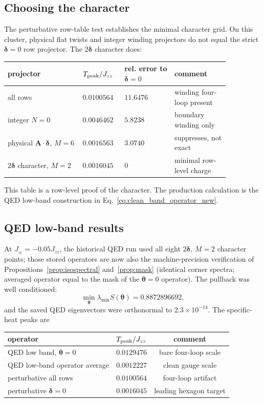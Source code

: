 \documentclass[11pt,letterpaper]{article}
\newcommand{\Jzz}{J_{zz}}
\newcommand{\Jpm}{J_{\pm}}
\newcommand{\bA}{\bm A}
\newcommand{\bdelta}{\bm \delta}
\newcommand{\btheta}{\bm \theta}
\theoremstyle{plain}
\theoremstyle{definition}
\begin{document}
\subsection{Choosing the character}

The perturbative row-table test establishes the minimal character grid.  On
this cluster, physical flat twists and integer winding projectors do not equal
the strict $\bdelta=0$ row projector.  The $2\bdelta$ character does:
\begin{center}
\footnotesize
\begin{tabular}{@{}p{0.30\linewidth}p{0.14\linewidth}p{0.20\linewidth}p{0.22\linewidth}@{}}
\toprule
projector & $T_{\rm peak}/\Jzz$ & rel. error to $\bdelta=0$
& comment\\
\midrule
all rows & $0.0100564$ & $11.6476$ & winding four-loop present\\
integer $N=0$ & $0.0046462$ & $5.8238$ & boundary winding only\\
physical $\bA\!\cdot\!\bdelta$, $M=6$ & $0.0016563$ & $3.0740$
& suppresses, not exact\\
$2\bdelta$ character, $M=2$ & $0.0016045$ & $0$
& minimal row-level charge\\
\bottomrule
\end{tabular}
\end{center}
This table is a row-level proof of the character.  The production calculation
is the QED low-band construction in Eq.~\eqref{eq:clean_band_operator_new}.

\subsection{QED low-band results}

At $\Jpm=-0.05\Jzz$, the historical QED run used all eight $2\bdelta$, $M=2$
character points; those stored operators are now also the machine-precision
verification of Propositions~\ref{prop:isospectral} and~\ref{prop:mask}
(identical corner spectra; averaged operator equal to the mask of the
$\btheta=0$ operator).  The pullback was well conditioned:
\[
\min_{\btheta}\lambda_{\min}S(\btheta)=0.8872896692,
\]
and the saved QED eigenvectors were orthonormal to $2.3\times10^{-14}$.  The
specific-heat peaks are
\begin{center}
\begin{tabular}{lcc}
\toprule
operator & $T_{\rm peak}/\Jzz$ & comment\\
\midrule
QED low band, $\btheta=0$ & $0.0129476$ & bare four-loop scale\\
QED low-band operator average & $0.0012227$ & clean gauge scale\\
perturbative all rows & $0.0100564$ & four-loop artifact\\
perturbative $\bdelta=0$ & $0.0016045$ & leading hexagon target\\
\bottomrule
\end{tabular}
\end{center}
\end{document}
